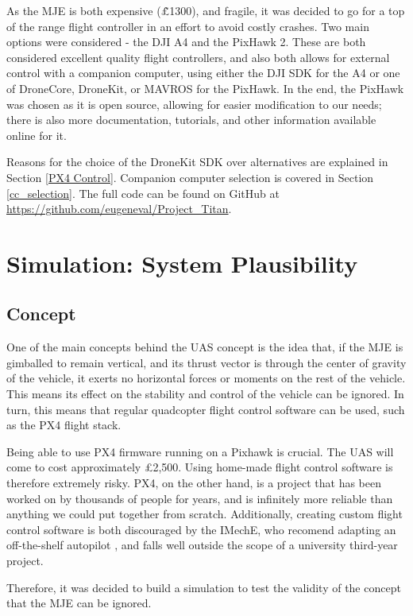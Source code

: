 \documentclass[11pt]{article}
\begin{document}
As the MJE is both expensive (\~\pounds1300), and fragile, it was decided to go for a top of the range flight controller in an effort to avoid costly crashes. Two main options were considered - the DJI A4 and the PixHawk 2. These are both considered excellent quality flight controllers, and also both allows for external control with a companion computer, using either the DJI SDK for the A4 or one of DroneCore, DroneKit, or MAVROS for the PixHawk. In the end, the PixHawk was chosen as it is open source, allowing for easier modification to our needs; there is also more documentation, tutorials, and other information available online for it.

Reasons for the choice of the DroneKit SDK over alternatives are explained in Section \ref{PX4 Control}. Companion computer selection is covered in Section \ref{cc_selection}. The full code can be found on GitHub at \url{https://github.com/eugeneval/Project_Titan}.


\section{Simulation: System Plausibility} \label{simulation}
\subsection{Concept}
One of the main concepts behind the UAS concept is the idea that, if the MJE is gimballed to remain vertical, and its thrust vector is through the center of gravity of the vehicle, it exerts no horizontal forces or moments on the rest of the vehicle. This means its effect on the stability and control of the vehicle can be ignored. In turn, this means that regular quadcopter flight control software can be used, such as the PX4 flight stack.

Being able to use PX4 firmware running on a Pixhawk is crucial. The UAS will come to cost approximately \pounds2,500. Using home-made flight control software is therefore extremely risky. PX4, on the other hand, is a project that has been worked on by thousands of people for years, and is infinitely more reliable than anything we could put together from scratch. Additionally, creating custom flight control software is both discouraged by the IMechE, who recomend adapting an off-the-shelf autopilot \cite{IMechE_rules}, and falls well outside the scope of a university third-year project.

Therefore, it was decided to build a simulation to test the validity of the concept that the MJE can be ignored.
\end{document}
